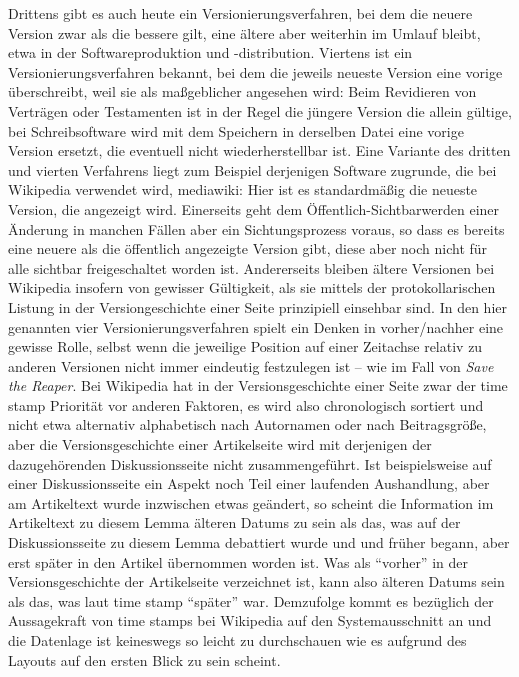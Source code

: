 \documentclass[fontsize=12pt]{scrartcl}
\begin{document}
Drittens gibt es auch heute ein Versionierungsverfahren, bei dem die neuere Version zwar als die bessere gilt, eine \"altere aber weiterhin im Umlauf bleibt, etwa in der Softwareproduktion und -distribution. Viertens ist ein Versionierungsverfahren bekannt, bei dem die jeweils neueste Version eine vorige \"uberschreibt, weil sie als ma{\ss}geblicher angesehen wird: Beim Revidieren von Vertr\"agen oder Testamenten ist in der Regel die j\"ungere Version die allein g\"ultige, bei Schreibsoftware wird mit dem Speichern in derselben Datei eine vorige Version ersetzt, die eventuell nicht wiederherstellbar ist. Eine Variante des dritten und vierten Verfahrens liegt zum Beispiel derjenigen Software zugrunde, die bei Wi\-ki\-pe\-dia verwendet wird, mediawiki: \mbox{Hier} ist es standardm\"a{\ss}ig die neueste Version, die angezeigt wird. Einerseits geht dem \"Of\-fent\-lich-Sichtbarwerden einer \"Anderung in manchen F\"allen aber ein Sichtungsprozess voraus, so dass es bereits eine neuere als die \"of\-fent\-lich angezeigte Version gibt, diese aber noch nicht f\"ur alle sichtbar freigeschaltet worden ist. An\-de\-rerseits bleiben \"altere Versionen bei Wi\-ki\-pe\-dia insofern von gewisser G\"ultigkeit, als sie mittels der protokollarischen Listung in der Versiongeschichte einer Seite prinzipiell einsehbar sind. In den \mbox{hier} genannten \mbox{vier} Versionierungsverfahren spielt ein Denken in vorher/nachher eine gewisse Rolle, \mbox{selbst} wenn die jeweilige Position auf einer Zeitachse relativ zu anderen Versionen nicht immer eindeutig festzulegen ist -- wie im Fall von \textit{Save the Reaper}. Bei Wi\-ki\-pe\-dia hat in der Versionsgeschichte einer Seite zwar der time stamp Priorit\"at vor anderen Faktoren, es wird also chro\-no\-lo\-gisch sortiert und nicht etwa alternativ alphabetisch nach Autor\textsuperscript{\tiny *}namen oder nach Beitragsgr\"o{\ss}e, aber die Versionsgeschichte einer Artikelseite wird mit derjenigen der dazugeh\"orenden Dis\-kus\-si\-onsseite nicht zusammengef\"uhrt. Ist beispielsweise auf einer Dis\-kus\-si\-onsseite ein Aspekt noch Teil einer laufenden Aushandlung, aber am Artikeltext wurde in\-zwi\-schen etwas ge\"andert, so scheint die Information im Artikeltext zu diesem Lemma \"alteren Datums zu sein als das, was auf der Dis\-kus\-si\-onsseite zu diesem Lemma debattiert wurde und und fr\"uher begann, aber erst sp\"ater in den Artikel \"ubernommen worden ist. Was als "`vorher"' in der Versionsgeschichte der Artikelseite verzeichnet ist, kann also \"alteren Datums sein als das, was laut time stamp "`sp\"ater"' war. Demzufolge kommt es bez\"uglich der Aussagekraft von time stamps bei Wi\-ki\-pe\-dia auf den Systemausschnitt an und die Datenlage ist keineswegs so leicht zu durchschauen wie es aufgrund des Layouts auf den ersten Blick zu sein scheint. 
\end{document}
